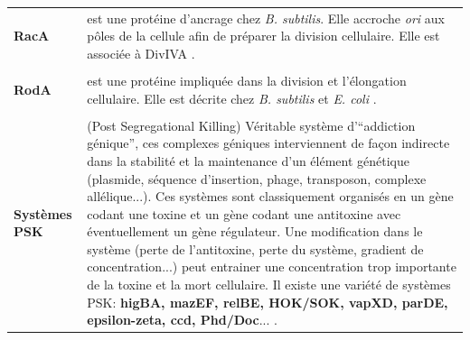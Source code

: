 \begin{longtable}{@{\hspace{-2cm}\hspace{1cm}} >{\bfseries}p{} | >{\small}p{}}
	\\[-0.2cm]
	 RacA & est une protéine d'ancrage chez \textit{B. subtilis}. Elle accroche \textit{ori} aux pôles de la cellule afin de préparer la division cellulaire. Elle est associée à DivIVA \citep{OSullivan2011}.\\
	\\[-0.2cm]
	 RodA & est une protéine impliquée dans la division et l'élongation cellulaire. Elle est décrite chez \textit{B. subtilis} et \textit{E. coli} \citep{henriques1998control}.\\
	\\[-0.2cm]
	 Systèmes PSK & (Post Segregational Killing) Véritable système d'“addiction génique”, ces complexes géniques interviennent de façon indirecte dans la stabilité et la maintenance d'un élément génétique (plasmide, séquence d'insertion, phage, transposon, complexe allélique...). Ces systèmes sont classiquement organisés en un gène codant une toxine et un gène codant une antitoxine avec éventuellement un gène régulateur. Une modification dans le système (perte de l'antitoxine, perte du système, gradient de concentration...) peut entrainer une concentration trop importante de la toxine et la mort cellulaire. Il existe une variété de systèmes PSK: \textbf{higBA, mazEF, relBE, HOK/SOK, vapXD, parDE, epsilon-zeta, ccd, Phd/Doc}... \citep{kobayashi2004genetic}.\\
 \end{longtable}
 
